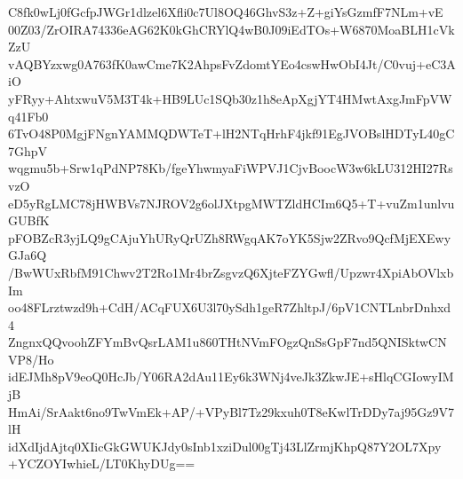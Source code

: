C8fk0wLj0fGcfpJWGr1dlzel6Xfli0c7Ul8OQ46GhvS3z+Z+giYsGzmfF7NLm+vE
00Z03/ZrOIRA74336eAG62K0kGhCRYlQ4wB0J09iEdTOs+W6870MoaBLH1cVkZzU
vAQBYzxwg0A763fK0awCme7K2AhpsFvZdomtYEo4cswHwObI4Jt/C0vuj+eC3AiO
yFRyy+AhtxwuV5M3T4k+HB9LUc1SQb30z1h8eApXgjYT4HMwtAxgJmFpVWq41Fb0
6TvO48P0MgjFNgnYAMMQDWTeT+lH2NTqHrhF4jkf91EgJVOBslHDTyL40gC7GhpV
wqgmu5b+Srw1qPdNP78Kb/fgeYhwmyaFiWPVJ1CjvBoocW3w6kLU312HI27RsvzO
eD5yRgLMC78jHWBVs7NJROV2g6olJXtpgMWTZldHCIm6Q5+T+vuZm1unlvuGUBfK
pFOBZcR3yjLQ9gCAjuYhURyQrUZh8RWgqAK7oYK5Sjw2ZRvo9QcfMjEXEwyGJa6Q
/BwWUxRbfM91Chwv2T2Ro1Mr4brZsgvzQ6XjteFZYGwfl/Upzwr4XpiAbOVlxbIm
oo48FLrztwzd9h+CdH/ACqFUX6U3l70ySdh1geR7ZhltpJ/6pV1CNTLnbrDnhxd4
ZngnxQQvoohZFYmBvQsrLAM1u860THtNVmFOgzQnSsGpF7nd5QNISktwCNVP8/Ho
idEJMh8pV9eoQ0HcJb/Y06RA2dAu11Ey6k3WNj4veJk3ZkwJE+sHlqCGIowyIMjB
HmAi/SrAakt6no9TwVmEk+AP/+VPyBl7Tz29kxuh0T8eKwlTrDDy7aj95Gz9V7lH
idXdIjdAjtq0XIicGkGWUKJdy0sInb1xziDul00gTj43LlZrmjKhpQ87Y2OL7Xpy
+YCZOYIwhieL/LT0KhyDUg==
